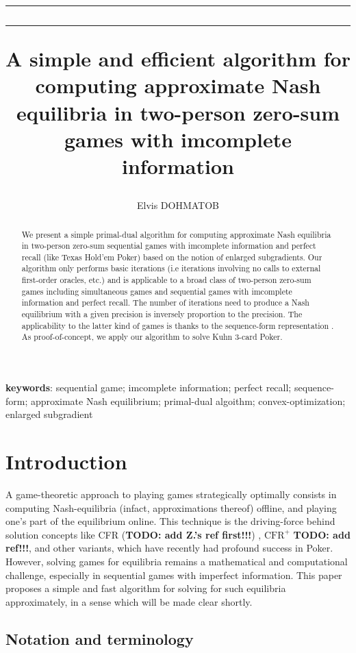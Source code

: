 \documentclass[envcountsame]{llcns2e/llncs}
\title{\hrule\hrule\bigskip\bigskip A simple and efficient algorithm for computing approximate
  Nash equilibria in two-person zero-sum games with imcomplete
  information}
\author{Elvis DOHMATOB\\\email{elvis.dohmatob@inria.fr}}
\institute{
Parietal team, Inria Saclay Ile-de-France, Saclay, France
}
\begin{document}
\maketitle

\begin{abstract}
We present a simple primal-dual algorithm for computing approximate
Nash equilibria in two-person zero-sum sequential games with
imcomplete information and perfect recall (like Texas Hold'em
Poker) based on the notion of enlarged subgradients.
Our algorithm only performs basic iterations (i.e iterations
involving no calls to external first-order oracles, etc.) and is
applicable to a broad class of two-person zero-sum games including
simultaneous games and sequential games with imcomplete information
and perfect recall. The number of iterations need to produce a Nash
equilibrium with a given precision is inversely proportion to the
precision. The applicability to the latter kind of games is thanks to
the sequence-form representation \cite{koller1992complexity}. As
proof-of-concept, we apply our algorithm to solve Kuhn 3-card Poker.
\end{abstract}

\textbf{keywords}: sequential game; imcomplete information; perfect
recall; sequence-form; approximate Nash equilibrium; primal-dual
algoithm; convex-optimization; enlarged subgradient

\section{Introduction}
\label{sec:intro}
A game-theoretic approach to playing games strategically optimally
consists in computing Nash-equilibria (infact, approximations thereof)
offline, and playing one's part of the equilibrium online. This
technique is the driving-force behind solution concepts like CFR
(\textbf{TODO: add Z.'s ref first!!!}) \cite{lanctot2009monte},
$\text{CFR}^{+}$ \textbf{TODO: add ref!!!}, and other variants, which
have recently had profound success in Poker. However, solving games
for equilibria remains a mathematical and computational challenge,
especially in sequential games with imperfect information. This paper
proposes a simple and fast algorithm for solving for such equilibria
approximately, in a sense which will be made clear shortly.

\subsection{Notation and terminology}
\end{document}
